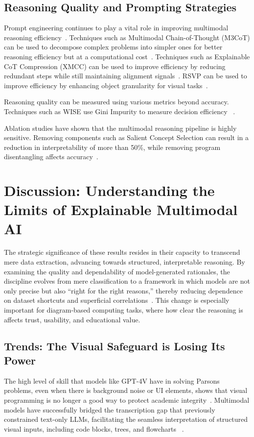 \documentclass[sigconf, nonacm]{acmart}
\begin{document}
\subsection{Reasoning Quality and Prompting Strategies}
Prompt engineering continues to play a vital role in improving multimodal 
reasoning efficiency~\cite{singh2024flowvqa, denny2023conversing}. 
Techniques such as Multimodal Chain-of-Thought (M3CoT) can be used to 
decompose complex problems into simpler ones for better reasoning 
efficiency but at a computational cost~\cite{chen2024m3cot}. 
Techniques such as Explainable CoT Compression (XMCC) can be used to 
improve efficiency by reducing redundant steps while still maintaining 
alignment signals~\cite{wang2026bridging}. RSVP can be used to improve 
efficiency by enhancing object granularity for visual tasks~\cite{lu2025rsvp}. 

Reasoning quality can be measured using various metrics beyond accuracy. 
Techniques such as WISE use Gini Impurity to measure decision efficiency~%
\cite{jiang2025wise}. 

Ablation studies have shown that the multimodal reasoning pipeline is 
highly sensitive. Removing components such as Salient Concept Selection 
can result in a reduction in interpretability of more than 50\%, while 
removing program disentangling affects accuracy~\cite{jiang2025wise}.

\section{Discussion: Understanding the Limits of Explainable Multimodal AI}
The strategic significance of these results resides in their capacity to 
transcend mere data extraction, advancing towards structured, interpretable 
reasoning. By examining the quality and dependability of model-generated 
rationales, the discipline evolves from mere classification to a framework 
in which models are not only precise but also ``right for the right reasons,'' 
thereby reducing dependence on dataset shortcuts and superficial 
correlations~\cite{chen2024m3cot, wang2026bridging, jiang2025wise}. 
This change is especially important for diagram-based computing tasks, where 
how clear the reasoning is affects trust, usability, and educational value.

\subsection{Trends: The Visual Safeguard is Losing Its Power}
The high level of skill that models like GPT-4V have in solving Parsons 
problems, even when there is background noise or UI elements, shows that 
visual programming is no longer a good way to protect academic 
integrity~\cite{hou2024more}. Multimodal models have successfully bridged 
the transcription gap that previously constrained text-only LLMs, 
facilitating the seamless interpretation of structured visual inputs, 
including code blocks, trees, and flowcharts~%
\cite{gutierrez2024seeing, hou2024more}.
\end{document}
